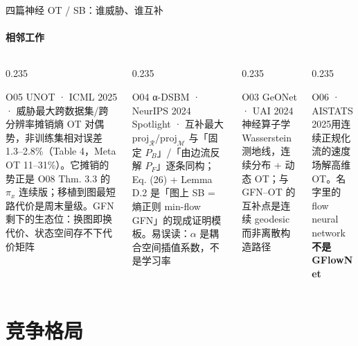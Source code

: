 \documentclass[aspectratio=169,10pt]{beamer}
\newcommand{\pos}[1]{\textcolor{positive}{#1}}
\newcommand{\con}[1]{\textcolor{negative}{#1}}
\begin{document}
\begin{frame}{四篇神经 OT / SB：谁威胁、谁互补}\framesubtitle{相邻工作}
\begin{columns}[T]
\begin{column}{0.235\textwidth}\begin{block}{O05 UNOT · ICML 2025 · \con{威胁最大}}\footnotesize 跨数据集/跨分辨率摊销熵 OT 对偶势，非训练集相对误差 1.3–2.8\%（Table 4，Meta OT 11–31\%）。它摊销的势正是 O08 Thm. 3.3 的 $\pi_x$ 连续版；移植到图最短路代价是周末量级。GFN 剩下的生态位：换图即换代价、状态空间存不下代价矩阵\end{block}\end{column}
\begin{column}{0.235\textwidth}\begin{block}{O04 α-DSBM · NeurIPS 2024 Spotlight · \pos{互补最大}}\footnotesize $\mathrm{proj}_{\mathcal R}/\mathrm{proj}_{\mathcal M}$ 与「固定 $P_B$」/「由边流反解 $P_F$」逐条同构；Eq. (26) + Lemma D.2 是「图上 SB = 熵正则 min-flow GFN」的现成证明模板。易误读：$\alpha$ 是耦合空间插值系数，不是学习率\end{block}\end{column}
\begin{column}{0.235\textwidth}\begin{block}{O03 GeONet · UAI 2024}\footnotesize 神经算子学 Wasserstein 测地线，连续分布 + 动态 OT；与 GFN–OT 的互补点是连续 geodesic 而非离散构造路径\end{block}\end{column}
\begin{column}{0.235\textwidth}\begin{block}{O06 · AISTATS 2025}\footnotesize 用连续正规化流的速度场解高维 OT。名字里的 flow neural network \textbf{不是 GFlowNet}\end{block}\end{column}
\end{columns}
\end{frame}

\section{竞争格局}
\end{document}
